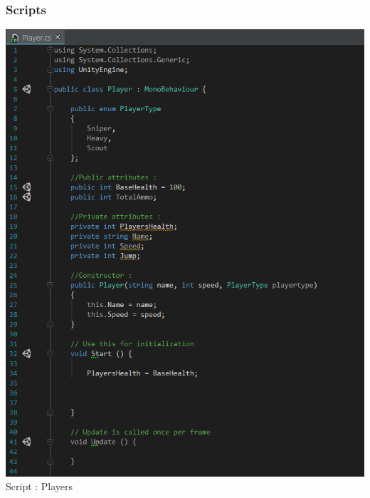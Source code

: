 \documentclass[12pt]{article}
\begin{document}
	\subsubsection{Scripts}
\bigskip
	
\begin{center}
	
	\includegraphics[scale = 0.75]{Script_players.PNG}\\[1cm]
    Script : Players



\end{center}
\end{document}
